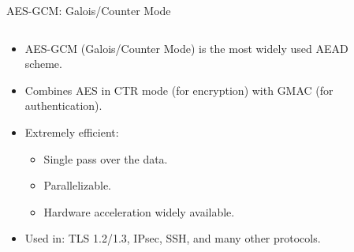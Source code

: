 \documentclass[aspectratio=169, lualatex, handout]{beamer}
\begin{document}
\begin{frame}{AES-GCM: Galois/Counter Mode}
	\begin{columns}[c]
		\begin{column}{0.6\textwidth}
			\begin{itemize}[<+->]
				\item AES-GCM (Galois/Counter Mode) is the most widely used AEAD scheme.
				\item Combines AES in CTR mode (for encryption) with GMAC (for authentication).
				\item Extremely efficient:
				      \begin{itemize}
					      \item Single pass over the data.
					      \item Parallelizable.
					      \item Hardware acceleration widely available.
				      \end{itemize}
				\item Used in: TLS 1.2/1.3, IPsec, SSH, and many other protocols.
			\end{itemize}
		\end{column}
		\begin{column}{0.4\textwidth}
			\begin{center}
			\end{center}
		\end{column}
	\end{columns}
\end{frame}
\end{document}
